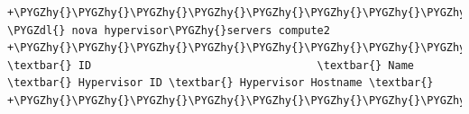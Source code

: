 \documentclass[letterpaper,10pt,english]{sphinxmanual}
\def\PYGZdl{\char`\$}
\def\PYGZhy{\char`\-}
\begin{document}
\begin{enumerate}
\begin{Verbatim}[commandchars=\\\{\}]
+\PYGZhy{}\PYGZhy{}\PYGZhy{}\PYGZhy{}\PYGZhy{}\PYGZhy{}\PYGZhy{}\PYGZhy{}\PYGZhy{}\PYGZhy{}\PYGZhy{}\PYGZhy{}\PYGZhy{}\PYGZhy{}\PYGZhy{}\PYGZhy{}\PYGZhy{}\PYGZhy{}\PYGZhy{}\PYGZhy{}\PYGZhy{}\PYGZhy{}\PYGZhy{}\PYGZhy{}\PYGZhy{}\PYGZhy{}\PYGZhy{}\PYGZhy{}\PYGZhy{}\PYGZhy{}\PYGZhy{}\PYGZhy{}\PYGZhy{}\PYGZhy{}\PYGZhy{}\PYGZhy{}\PYGZhy{}\PYGZhy{}+\PYGZhy{}\PYGZhy{}\PYGZhy{}\PYGZhy{}\PYGZhy{}\PYGZhy{}\PYGZhy{}\PYGZhy{}\PYGZhy{}\PYGZhy{}\PYGZhy{}\PYGZhy{}\PYGZhy{}\PYGZhy{}\PYGZhy{}\PYGZhy{}\PYGZhy{}\PYGZhy{}\PYGZhy{}+\PYGZhy{}\PYGZhy{}\PYGZhy{}\PYGZhy{}\PYGZhy{}\PYGZhy{}\PYGZhy{}\PYGZhy{}\PYGZhy{}\PYGZhy{}\PYGZhy{}\PYGZhy{}\PYGZhy{}\PYGZhy{}\PYGZhy{}+\PYGZhy{}\PYGZhy{}\PYGZhy{}\PYGZhy{}\PYGZhy{}\PYGZhy{}\PYGZhy{}\PYGZhy{}\PYGZhy{}\PYGZhy{}\PYGZhy{}\PYGZhy{}\PYGZhy{}\PYGZhy{}\PYGZhy{}\PYGZhy{}\PYGZhy{}\PYGZhy{}\PYGZhy{}\PYGZhy{}\PYGZhy{}+
\PYGZdl{} nova hypervisor\PYGZhy{}servers compute2
+\PYGZhy{}\PYGZhy{}\PYGZhy{}\PYGZhy{}\PYGZhy{}\PYGZhy{}\PYGZhy{}\PYGZhy{}\PYGZhy{}\PYGZhy{}\PYGZhy{}\PYGZhy{}\PYGZhy{}\PYGZhy{}\PYGZhy{}\PYGZhy{}\PYGZhy{}\PYGZhy{}\PYGZhy{}\PYGZhy{}\PYGZhy{}\PYGZhy{}\PYGZhy{}\PYGZhy{}\PYGZhy{}\PYGZhy{}\PYGZhy{}\PYGZhy{}\PYGZhy{}\PYGZhy{}\PYGZhy{}\PYGZhy{}\PYGZhy{}\PYGZhy{}\PYGZhy{}\PYGZhy{}\PYGZhy{}\PYGZhy{}+\PYGZhy{}\PYGZhy{}\PYGZhy{}\PYGZhy{}\PYGZhy{}\PYGZhy{}\PYGZhy{}\PYGZhy{}\PYGZhy{}\PYGZhy{}\PYGZhy{}\PYGZhy{}\PYGZhy{}\PYGZhy{}\PYGZhy{}\PYGZhy{}\PYGZhy{}\PYGZhy{}\PYGZhy{}+\PYGZhy{}\PYGZhy{}\PYGZhy{}\PYGZhy{}\PYGZhy{}\PYGZhy{}\PYGZhy{}\PYGZhy{}\PYGZhy{}\PYGZhy{}\PYGZhy{}\PYGZhy{}\PYGZhy{}\PYGZhy{}\PYGZhy{}+\PYGZhy{}\PYGZhy{}\PYGZhy{}\PYGZhy{}\PYGZhy{}\PYGZhy{}\PYGZhy{}\PYGZhy{}\PYGZhy{}\PYGZhy{}\PYGZhy{}\PYGZhy{}\PYGZhy{}\PYGZhy{}\PYGZhy{}\PYGZhy{}\PYGZhy{}\PYGZhy{}\PYGZhy{}\PYGZhy{}\PYGZhy{}+
\textbar{} ID                                   \textbar{} Name              \textbar{} Hypervisor ID \textbar{} Hypervisor Hostname \textbar{}
+\PYGZhy{}\PYGZhy{}\PYGZhy{}\PYGZhy{}\PYGZhy{}\PYGZhy{}\PYGZhy{}\PYGZhy{}\PYGZhy{}\PYGZhy{}\PYGZhy{}\PYGZhy{}\PYGZhy{}\PYGZhy{}\PYGZhy{}\PYGZhy{}\PYGZhy{}\PYGZhy{}\PYGZhy{}\PYGZhy{}\PYGZhy{}\PYGZhy{}\PYGZhy{}\PYGZhy{}\PYGZhy{}\PYGZhy{}\PYGZhy{}\PYGZhy{}\PYGZhy{}\PYGZhy{}\PYGZhy{}\PYGZhy{}\PYGZhy{}\PYGZhy{}\PYGZhy{}\PYGZhy{}\PYGZhy{}\PYGZhy{}+\PYGZhy{}\PYGZhy{}\PYGZhy{}\PYGZhy{}\PYGZhy{}\PYGZhy{}\PYGZhy{}\PYGZhy{}\PYGZhy{}\PYGZhy{}\PYGZhy{}\PYGZhy{}\PYGZhy{}\PYGZhy{}\PYGZhy{}\PYGZhy{}\PYGZhy{}\PYGZhy{}\PYGZhy{}+\PYGZhy{}\PYGZhy{}\PYGZhy{}\PYGZhy{}\PYGZhy{}\PYGZhy{}\PYGZhy{}\PYGZhy{}\PYGZhy{}\PYGZhy{}\PYGZhy{}\PYGZhy{}\PYGZhy{}\PYGZhy{}\PYGZhy{}+\PYGZhy{}\PYGZhy{}\PYGZhy{}\PYGZhy{}\PYGZhy{}\PYGZhy{}\PYGZhy{}\PYGZhy{}\PYGZhy{}\PYGZhy{}\PYGZhy{}\PYGZhy{}\PYGZhy{}\PYGZhy{}\PYGZhy{}\PYGZhy{}\PYGZhy{}\PYGZhy{}\PYGZhy{}\PYGZhy{}\PYGZhy{}+

\end{Verbatim}
\end{enumerate}
\end{document}
